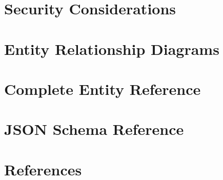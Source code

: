 \documentclass[12pt,a4paper]{article}
\begin{document}
\section{Security Considerations}
\label{sec:security}



\appendix

\section{Entity Relationship Diagrams}
\label{app:erd}


\section{Complete Entity Reference}
\label{app:entity-reference}


\section{JSON Schema Reference}
\label{app:schema-reference}



\newpage
\section*{References}
\end{document}

